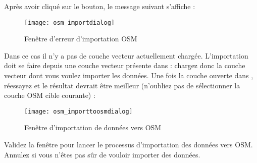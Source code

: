 Après avoir cliqué sur le bouton, le message suivant s'affiche :

\begin{figure}[ht]
\centering
   
   \texttt{[image: osm\_importdialog]}
   \caption{Fenêtre d'erreur d'importation OSM \nixcaption}\label{fig:osmimportmessage}
\end{figure}

Dans ce cas il n'y a pas de couche vecteur actuellement chargée. L'importation doit se faire depuis une couche vecteur présente dans \qg : chargez donc la couche vecteur dont vous voulez importer les données. Une fois la couche ouverte dans \qg, réessayez et le résultat devrait être meilleur (n'oubliez pas de sélectionner la couche OSM cible courante) :

\begin{figure}[ht]
\centering
  
   \texttt{[image: osm\_importtoosmdialog]}
   \caption{Fenêtre d'importation de données vers OSM \nixcaption}\label{fig:osmimporttoosm}
\end{figure}

Validez la fenêtre pour lancer le processus d'importation des données vers OSM. Annulez si vous n'êtes pas sûr de vouloir importer des données.
